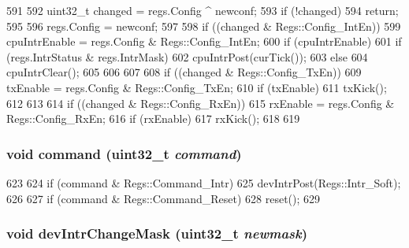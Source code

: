 \begin{DoxyCode}
591 {
592     uint32_t changed = regs.Config ^ newconf;
593     if (!changed)
594         return;
595 
596     regs.Config = newconf;
597 
598     if ((changed & Regs::Config_IntEn)) {
599         cpuIntrEnable = regs.Config & Regs::Config_IntEn;
600         if (cpuIntrEnable) {
601             if (regs.IntrStatus & regs.IntrMask)
602                 cpuIntrPost(curTick());
603         } else {
604             cpuIntrClear();
605         }
606     }
607 
608     if ((changed & Regs::Config_TxEn)) {
609         txEnable = regs.Config & Regs::Config_TxEn;
610         if (txEnable)
611             txKick();
612     }
613 
614     if ((changed & Regs::Config_RxEn)) {
615         rxEnable = regs.Config & Regs::Config_RxEn;
616         if (rxEnable)
617             rxKick();
618     }
619 }
\end{DoxyCode}
\hypertarget{classSinic_1_1Device_a8747db3299e3afcb225c4e64f725f453}{
\subsubsection[{command}]{\setlength{\rightskip}{0pt plus 5cm}void command ({\bf uint32\_\-t} {\em command})}}
\label{classSinic_1_1Device_a8747db3299e3afcb225c4e64f725f453}



\begin{DoxyCode}
623 {
624     if (command & Regs::Command_Intr)
625         devIntrPost(Regs::Intr_Soft);
626 
627     if (command & Regs::Command_Reset)
628         reset();
629 }
\end{DoxyCode}
\hypertarget{classSinic_1_1Device_a776f6f1cbea3e0200c28319eb0d5446b}{
\subsubsection[{devIntrChangeMask}]{\setlength{\rightskip}{0pt plus 5cm}void devIntrChangeMask ({\bf uint32\_\-t} {\em newmask})}}
\label{classSinic_1_1Device_a776f6f1cbea3e0200c28319eb0d5446b}



